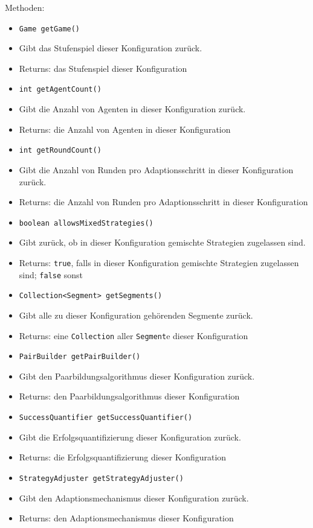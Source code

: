 \documentclass[parskip=full,11pt]{scrartcl}
\begin{document}
Methoden:
\begin{itemize}\itemsep -10pt
\item \texttt{Game getGame()}
\item[] Gibt das Stufenspiel dieser Konfiguration zurück.
\item[] Returns: das Stufenspiel dieser Konfiguration

\item \texttt{int getAgentCount()}
\item[] Gibt die Anzahl von Agenten in dieser Konfiguration zurück.
\item[] Returns: die Anzahl von Agenten in dieser Konfiguration

\item \texttt{int getRoundCount()}
\item[] Gibt die Anzahl von Runden pro Adaptionsschritt in dieser Konfiguration zurück.
\item[] Returns: die Anzahl von Runden pro Adaptionsschritt in dieser Konfiguration

\item \texttt{boolean allowsMixedStrategies()}
\item[] Gibt zurück, ob in dieser Konfiguration gemischte Strategien zugelassen sind.
\item[] Returns: \texttt{true}, falls in dieser Konfiguration gemischte Strategien zugelassen sind; \texttt{false} sonst

\item \texttt{Collection<Segment> getSegments()}
\item[] Gibt alle zu dieser Konfiguration gehörenden Segmente zurück.
\item[] Returns: eine \texttt{Collection} aller \texttt{Segment}e dieser Konfiguration

\item \texttt{PairBuilder getPairBuilder()}
\item[] Gibt den Paarbildungsalgorithmus dieser Konfiguration zurück.
\item[] Returns: den Paarbildungsalgorithmus dieser Konfiguration

\item \texttt{SuccessQuantifier getSuccessQuantifier()}
\item[] Gibt die Erfolgsquantifizierung dieser Konfiguration zurück.
\item[] Returns: die Erfolgsquantifizierung dieser Konfiguration

\item \texttt{StrategyAdjuster getStrategyAdjuster()}
\item[] Gibt den Adaptionsmechanismus dieser Konfiguration zurück.
\item[] Returns: den Adaptionsmechanismus dieser Konfiguration


\end{itemize}
\end{document}
